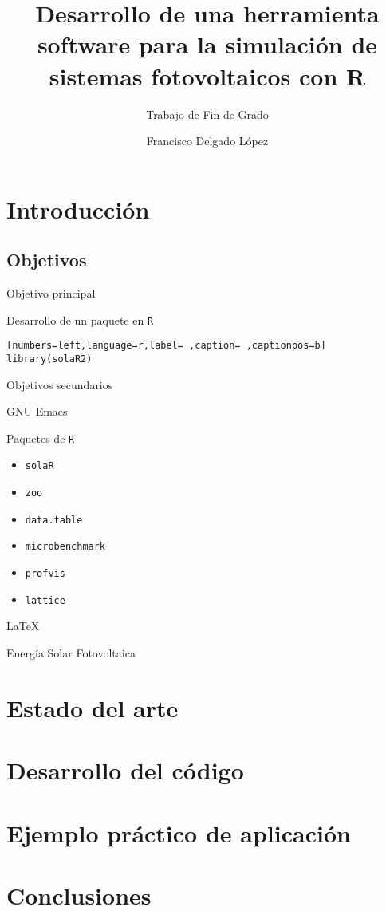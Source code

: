 \documentclass[aspectratio=169, usenames,svgnames,dvipsnames]{beamer}
\author{Francisco Delgado López}
\date{}
\title{Desarrollo de una herramienta software para la simulación de sistemas fotovoltaicos con R}
\subtitle{Trabajo de Fin de Grado}
\institute[UPM]{Universidad Politécnica de Madrid}
\begin{document}
\maketitle

\section{Introducción}
\label{sec:orgfbd76ba}
\subsection{Objetivos}
\label{sec:org01b6557}
\begin{frame}[label={sec:orgcbdb8ba},fragile]{Objetivo principal}
 \begin{block}{Desarrollo de un paquete en \texttt{R}}
\begin{lstlisting}[numbers=left,language=r,label= ,caption= ,captionpos=b]
library(solaR2)
\end{lstlisting}
\end{block}
\end{frame}

\begin{frame}[label={sec:orgdfaa785},fragile]{Objetivos secundarios}
 \begin{block}{GNU Emacs}
\end{block}
\begin{block}{Paquetes de \texttt{R}}
\begin{itemize}
\item \texttt{solaR}
\item \texttt{zoo}
\item \texttt{data.table}
\item \texttt{microbenchmark}
\item \texttt{profvis}
\item \texttt{lattice}
\end{itemize}
\end{block}
\begin{block}{\LaTeX{}}
\end{block}
\begin{block}{Energía Solar Fotovoltaica}
\end{block}
\end{frame}

\section{Estado del arte}
\label{sec:org545c2b9}

\section{Desarrollo del código}
\label{sec:org796e962}

\section{Ejemplo práctico de aplicación}
\label{sec:org9eb95eb}

\section{Conclusiones}
\label{sec:org579b4e4}
\end{document}
